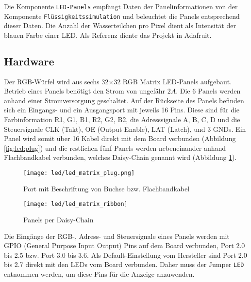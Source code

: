 Die Komponente \texttt{LED-Panels} empfängt Daten der Panelinformationen von der Komponente \texttt{Flüssigkeitssimulation} und beleuchtet die Panels entsprechend dieser Daten. Die Anzahl der Wasserteilchen pro Pixel dient als Intensität der blauen Farbe einer LED. Als Referenz diente das Projekt \cite{rgbLedMatrix} in Adafruit.

\subsection{Hardware}
Der RGB-Würfel wird aus sechs 32$\times$32 RGB Matrix LED-Panels aufgebaut. Betrieb eines Panels benötigt den Strom von ungefähr $2A$. Die 6 Panels werden anhand einer Stromversorgung geschaltet. Auf der Rückseite des Panels befinden sich ein Eingangs- und ein Ausgangsport mit jeweils 16 Pins. Diese sind für die Farbinformation R1, G1, B1, R2, G2, B2, die Adresssignale A, B, C, D und die Steuersignale CLK (Takt), OE (Output Enable), LAT (Latch), und 3 GNDs. Ein Panel wird somit über 16 Kabel direkt mit dem Board verbunden (Abbildung \ref{fig:led:plug}) und die restlichen fünf Panels werden nebeneinander anhand Flachbandkabel verbunden, welches Daisy-Chain genannt wird (Abbildung \ref{fig:led:chain}). 

\begin{figure}[h!]
	\centering
	\begin{minipage}[t]{0.45\linewidth}
	\texttt{[image: led/led\_matrix\_plug.png]}
	\caption{Port mit Beschriftung von Buchse bzw. Flachbandkabel}
	\label{fig:led:plug}
	\end{minipage}
	\hspace{0.05\linewidth}
	\begin{minipage}[t]{0.45\linewidth}
	\texttt{[image: led/led\_matrix\_ribbon]}
	\caption{Panels per Daisy-Chain}
	\label{fig:led:chain}
	\end{minipage}
\end{figure}

Die Eingänge der RGB-, Adress- und Steuersignale eines Panels werden mit GPIO (General Purpose Input Output) Pins auf dem Board verbunden, Port 2.0 bis 2.5 bzw. Port 3.0 bis 3.6. Als Default-Einstellung vom Hersteller sind Port 2.0 bis 2.7 direkt mit den LEDs vom Board verbunden. Daher muss der Jumper \texttt{LED} entnommen werden, um diese Pins für die Anzeige anzuwenden.

